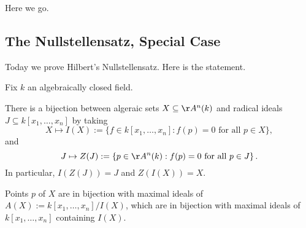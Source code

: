 
Here we go.

\subsection{The Nullstellensatz, Special Case}
Today we prove Hilbert's Nullstellensatz. Here is the statement.
\begin{theorem}[Nullstellensatz] \label{thm:nullstellensatz}
	Fix $k$ an algebraically closed field.
	\begin{listalph}
		\item There is a bijection between algeraic sets $X\subseteq\AA^n(k)$ and radical ideals $J\subseteq k[x_1,\ldots,x_n]$ by taking
		\[X\mapsto I(X):=\{f\in k[x_1,\ldots,x_n]:f(p)=0\text{ for all }p\in X\},\]
		and
		\[J\mapsto Z(J):=\left\{p\in\AA^n(k):f(p)=0\text{ for all }p\in J\right\}.\]
		In particular, $I(Z(J))=J$ and $Z(I(X))=X$.
		\item Points $p$ of $X$ are in bijection with maximal ideals of $A(X):=k[x_1,\ldots,x_n]/I(X)$, which are in bijection with maximal ideals of $k[x_1,\ldots,x_n]$ containing $I(X)$.
	\end{listalph}
\end{theorem}
